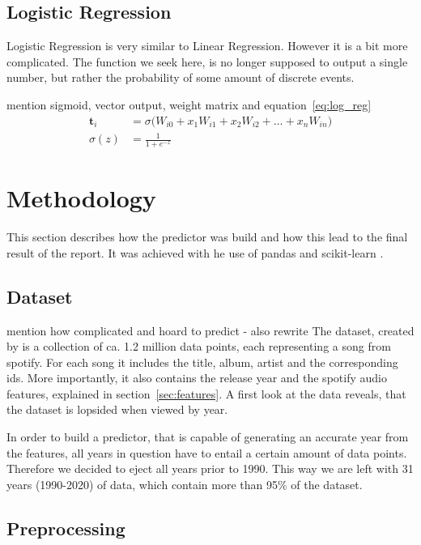 \documentclass{article}
\begin{document}
\subsection{Logistic Regression}\label{sec:log_reg}
Logistic Regression is very similar to Linear Regression. However it is a bit more complicated. The function we seek here, is no longer supposed to output a single number, but rather the probability of some amount of discrete events.

\answerTODO mention sigmoid, vector output, weight matrix and equation~\ref{eq:log_reg}
\begin{align}
  \mathbf{t}_i &= \sigma\Big(W_{i0} + x_1W_{i1}+ x_2W_{i2}+ \dots + x_nW_{in}\Big) \label{eq:log_reg} \\
  \sigma(z) &= \frac{1}{1+e^{-z}}
\end{align}

\section{Methodology}
This section describes how the predictor was build and how this lead to the final result of the report. It was achieved with he use of pandas \citep{pandas} and scikit-learn \citep{sklearn}.

\subsection{Dataset}\label{sec:dataset}
\answerTODO mention how complicated and hoard to predict - also rewrite
The dataset, created by \citet{dataset} is a collection of ca. 1.2 million data points, each representing a song from spotify. For each song it includes the title, album, artist and the corresponding ids. More importantly, it also contains the release year and the spotify audio features, explained in section~\ref{sec:features}. A first look at the data reveals, that the dataset is lopsided when viewed by year.

In order to build a predictor, that is capable of generating an accurate year from the features, all years in question have to entail a certain amount of data points. Therefore we decided to eject all years prior to 1990. This way we are left with 31 years (1990-2020) of data, which contain more than 95\% of the dataset.

\subsection{Preprocessing}
\end{document}
